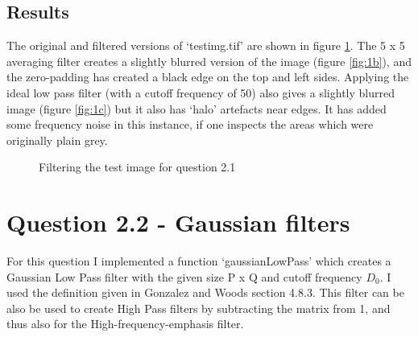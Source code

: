 \documentclass{article}
\begin{document}
\subsection*{Results}
The original and filtered versions of `testimg.tif' are shown in figure \ref{fig:q21}. The 5 x 5 averaging filter creates a slightly blurred version of the image (figure \ref{fig:1b}), and the zero-padding has created a black edge on the top and left sides.
Applying the ideal low pass filter (with a cutoff frequency of 50) also gives a slightly blurred image (figure \ref{fig:1c}) but it also has `halo' artefacts near edges. It has added some frequency noise in this instance, if one inspects the areas which were originally plain grey.
\begin{figure}[h]
\centering
	\qquad
	\qquad
	\caption{Filtering the test image for question 2.1}
	\label{fig:q21}
\end{figure}


\section*{Question 2.2 - Gaussian filters}
For this question I implemented a function `gaussianLowPass' which creates a Gaussian Low Pass filter with the given size P x Q and cutoff frequency $D_0$. I used the definition given in Gonzalez and Woods section 4.8.3. This filter can be also be used to create High Pass filters by subtracting the matrix from 1, and thus also for the High-frequency-emphasis filter.
\end{document}
